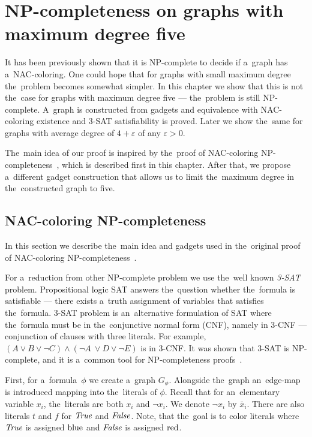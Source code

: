\chapter{NP-completeness on graphs with maximum degree five}%
\label{chapter:np}

\begin{chapterabstract}

	It has been previously shown that it is NP-complete to decide
	if a~graph has a~NAC-coloring.
	One could hope that for graphs with small maximum degree
	the~problem becomes somewhat simpler.
	In this chapter we show that this is not the~case
	for graphs with maximum degree five --- the~problem is still NP-complete.
	A~graph is constructed from gadgets and equivalence
	with NAC-coloring existence and 3-SAT satisfiability is proved.
	Later we show the~same for graphs with average degree of
	$4+\varepsilon$ of any $\varepsilon > 0$.

\end{chapterabstract}

The~main idea of our proof is inspired by
the~proof of NAC-coloring NP-completeness~\cite{np_complete},
which is described first in this chapter.
After that, we propose a~different gadget construction
that allows us to limit the~maximum
degree in the~constructed graph to five.

\section{NAC-coloring NP-completeness}

In this section we describe the~main idea and gadgets used
in the~original proof of NAC-coloring NP-completeness~\cite{np_complete}.

For a~reduction from other NP-complete problem
we use the~well known \emph{3-SAT} problem.
Propositional logic SAT answers the~question
whether the~formula is satisfiable ---
there exists a~truth assignment of variables that satisfies the~formula.
3-SAT problem is an~alternative formulation of SAT
where the~formula must be in the~conjunctive normal form (CNF), namely in 3-CNF
--- conjunction of clauses with three literals.
For example, \( (A \lor B \lor \lnot C) \land (\lnot A~\lor D \lor \lnot E) \)
is in 3-CNF\@.
It was shown that 3-SAT is NP-complete,
and it is a~common tool for NP-completeness proofs~\cite{3-sat}.

First, for a~formula~\( \phi \) we create a~graph \( G_\phi \).
Alongside the~graph an~edge-map is introduced mapping into the~literals
of \( \phi \). Recall that for an~elementary variable \( x_i \), the~literals
are both \( x_i \) and \( \neg x_i \). We denote \( \lnot x_i \) by \( \bar{x}_i \).
There are also literals \( t \) and \( f \) for \( \textit{True} \) and \( \textit{False} \).
Note, that the~goal is to color literals where \( \textit{True} \) is assigned \( \text{blue} \)
and \( \textit{False} \) is assigned \( \text{red} \).

